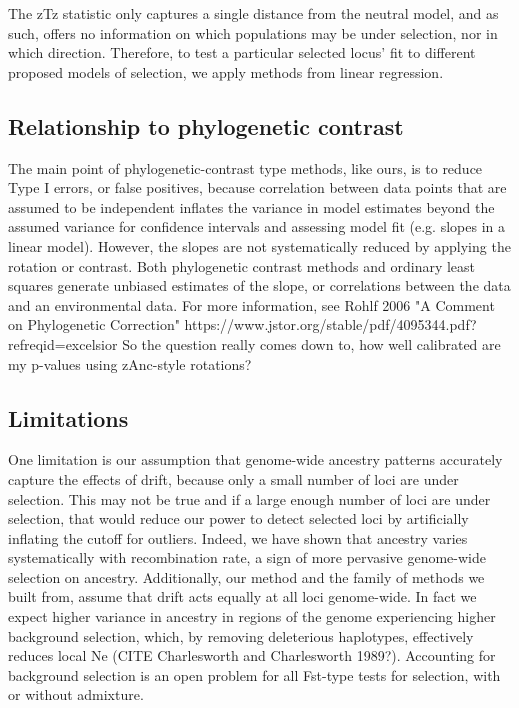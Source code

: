 \documentclass[12pt]{report}
\begin{document}
The zTz statistic only captures a single distance from the neutral model, and as such, offers no information on which populations may be under selection, nor in which direction. Therefore, to test a particular selected locus' fit to different proposed models of selection, we apply methods from linear regression. 



\subsection{Relationship to phylogenetic contrast}
The main point of phylogenetic-contrast type methods, like ours, is to reduce Type I errors, or false positives, because correlation between data points that are assumed to be independent inflates the variance in model estimates beyond the assumed variance for confidence intervals and assessing model fit (e.g. slopes in a linear model). However, the slopes are not systematically reduced by applying the rotation or contrast. Both phylogenetic contrast methods and ordinary least squares generate unbiased estimates of the slope, or correlations between the data and an environmental data. For more information, see Rohlf 2006 "A Comment on Phylogenetic Correction" https://www.jstor.org/stable/pdf/4095344.pdf?refreqid=excelsior%
So the question really comes down to, how well calibrated are my p-values using zAnc-style rotations?

\subsection{Limitations}
One limitation is our assumption that genome-wide ancestry patterns accurately capture the effects of drift, because only a small number of loci are under selection. This may not be true and if a large enough number of loci are under selection, that would reduce our power to detect selected loci by artificially inflating the cutoff for outliers. Indeed, we have shown that ancestry varies systematically with recombination rate, a sign of more pervasive genome-wide selection on ancestry. Additionally, our method and the family of methods we built from, assume that drift acts equally at all loci genome-wide. In fact we expect higher variance in ancestry in regions of the genome experiencing higher background selection, which, by removing deleterious haplotypes, effectively reduces local Ne (CITE Charlesworth and Charlesworth 1989?). Accounting for background selection is an open problem for all Fst-type tests for selection, with or without admixture.  
\end{document}
